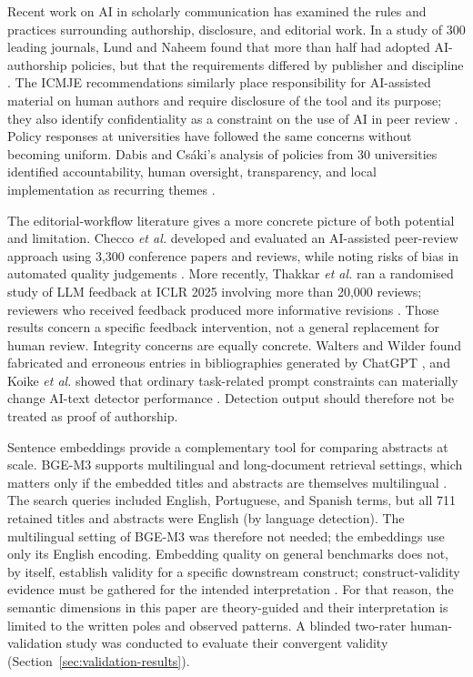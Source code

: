 \documentclass[a4paper,10pt,conference]{IEEEtran}
\begin{document}
Recent work on AI in scholarly communication has examined the rules and
practices surrounding authorship, disclosure, and editorial work. In a study of
300 leading journals, Lund and Naheem found that more than half had adopted
AI-authorship policies, but that the requirements differed by publisher and
discipline \cite{lund2024}. The ICMJE recommendations similarly place
responsibility for AI-assisted material on human authors and require disclosure
of the tool and its purpose; they also identify confidentiality as a constraint
on the use of AI in peer review \cite{icmje2026}. Policy responses at
universities have followed the same concerns without becoming uniform. Dabis and
Cs\'aki's analysis of policies from 30 universities identified accountability,
human oversight, transparency, and local implementation as recurring themes
\cite{dabis2024}.

The editorial-workflow literature gives a more concrete picture of both
potential and limitation. Checco \emph{et al.} developed and evaluated an
AI-assisted peer-review approach using 3,300 conference papers and reviews,
while noting risks of bias in automated quality judgements \cite{checco2021}.
More recently, Thakkar \emph{et al.} ran a randomised study of LLM feedback at
ICLR 2025 involving more than 20,000 reviews; reviewers who received feedback
produced more informative revisions \cite{thakkar2026}. Those results concern a
specific feedback intervention, not a general replacement for human review.
Integrity concerns are equally concrete. Walters and Wilder found fabricated
and erroneous entries in bibliographies generated by ChatGPT
\cite{walters2023}, and Koike \emph{et al.} showed that ordinary
task-related prompt constraints can materially change AI-text detector
performance \cite{koike2024}. Detection output should therefore not be treated
as proof of authorship.

Sentence embeddings provide a complementary tool for comparing abstracts at
scale. BGE-M3 supports multilingual and long-document retrieval settings, which
matters only if the embedded titles and abstracts are themselves multilingual
\cite{chen2024}. The search queries included English, Portuguese, and Spanish
terms, but all 711 retained titles and abstracts were English (by language
detection). The multilingual setting of BGE-M3 was therefore not needed; the
embeddings use only its English encoding. Embedding quality on general
benchmarks
does not, by itself, establish validity for a specific downstream construct;
construct-validity evidence must be gathered for the intended interpretation
\cite{fang2022}. For that reason, the semantic dimensions in this paper are
theory-guided and their interpretation is limited to the written poles and
observed patterns. A blinded two-rater human-validation study was conducted to
evaluate their convergent validity (Section~\ref{sec:validation-results}).
\end{document}
